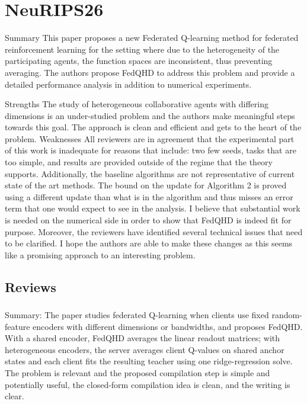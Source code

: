 
\section{NeuRIPS26}
Summary
This paper proposes a new Federated Q-learning method for federated reinforcement learning for the setting where due to the heterogeneity of the participating agents, the function spaces are inconsistent, thus preventing averaging. The authors propose FedQHD to address this problem and provide a detailed performance analysis in addition to numerical experiments.

Strengths
The study of heterogeneous collaborative agents with differing dimensions is an under-studied problem and the authors make meaningful steps towards this goal.
The approach is clean and efficient and gets to the heart of the problem.
Weaknesses
All reviewers are in agreement that the experimental part of this work is inadequate for reasons that include: two few seeds, tasks that are too simple, and results are provided outside of the 
 regime that the theory supports. Additionally, the baseline algorithms are not representative of current state of the art methods.
The bound on the update for Algorithm 2 is proved using a different update than what is in the algorithm and thus misses an error term that one would expect to see in the analysis.
I believe that substantial work is needed on the numerical side in order to show that FedQHD is indeed fit for purpose. Moreover, the reviewers have identified several technical issues that need to be clarified. I hope the authors are able to make these changes as this seems like a promising approach to an interesting problem.
\subsection{Reviews}
\subsubsection{}
Summary:
The paper studies federated Q-learning when clients use fixed random-feature encoders with different dimensions or bandwidths, and proposes FedQHD. With a shared encoder, FedQHD averages the linear readout matrices; with heterogeneous encoders, the server averages client Q-values on shared anchor states and each client fits the resulting teacher using one ridge-regression solve. The problem is relevant and the proposed compilation step is simple and potentially useful, the closed-form compilation idea is clean, and the writing is clear.

